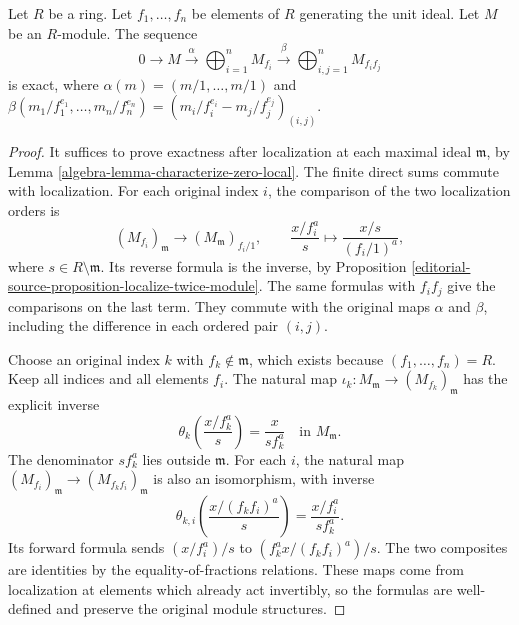 \begin{lemma}
\label{editorial-source-lemma-cover-module}
Let $R$ be a ring. Let $f_1, \ldots, f_n$ be elements of $R$
generating the unit ideal. Let $M$ be an $R$-module.
The sequence
$$
0 \to
M \xrightarrow{\alpha}
\bigoplus\nolimits_{i = 1}^n M_{f_i} \xrightarrow{\beta}
\bigoplus\nolimits_{i, j = 1}^n M_{f_i f_j}
$$
is exact, where $\alpha(m) = (m/1, \ldots, m/1)$
and $\beta(m_1/f_1^{e_1}, \ldots, m_n/f_n^{e_n})
= (m_i/f_i^{e_i} - m_j/f_j^{e_j})_{(i, j)}$.
\end{lemma}

\begin{proof}
It suffices to prove exactness after localization at each maximal
ideal $\mathfrak m$, by Lemma \ref{algebra-lemma-characterize-zero-local}.
The finite direct sums commute with localization. For each original
index $i$, the comparison of the two localization orders is
$$
(M_{f_i})_{\mathfrak m}\longrightarrow
(M_{\mathfrak m})_{f_i/1},\qquad
\frac{x/f_i^a}{s}\longmapsto\frac{x/s}{(f_i/1)^a},
$$
where $s\in R\setminus\mathfrak m$. Its reverse formula is the
inverse, by Proposition \ref{editorial-source-proposition-localize-twice-module}.
The same formulas with $f_if_j$ give the comparisons on the last term.
They commute with the original maps $\alpha$ and $\beta$, including
the difference in each ordered pair $(i,j)$.

\medskip\noindent
Choose an original index $k$ with $f_k\notin\mathfrak m$, which exists
because $(f_1,\ldots,f_n)=R$. Keep all indices and all elements $f_i$.
The natural map
$\iota_k:M_{\mathfrak m}\to(M_{f_k})_{\mathfrak m}$
has the explicit inverse
$$
\theta_k\left(\frac{x/f_k^a}{s}\right)=\frac{x}{sf_k^a}
\quad\text{in }M_{\mathfrak m}.
$$
The denominator $sf_k^a$ lies outside $\mathfrak m$.
For each $i$, the natural map
$(M_{f_i})_{\mathfrak m}\to(M_{f_kf_i})_{\mathfrak m}$
is also an isomorphism, with inverse
$$
\theta_{k,i}\left(\frac{x/(f_kf_i)^a}{s}\right)
=\frac{x/f_i^a}{sf_k^a}.
$$
Its forward formula sends $(x/f_i^a)/s$ to
$(f_k^ax/(f_kf_i)^a)/s$. The two composites are identities by
the equality-of-fractions relations. These maps come from localization
at elements which already act invertibly, so the formulas are
well-defined and preserve the original module structures.


\end{proof}
